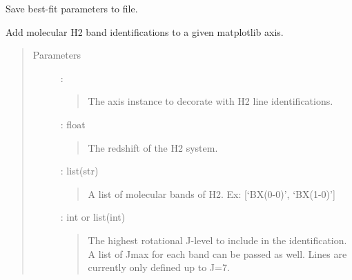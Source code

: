 \documentclass[letterpaper,10pt,english]{sphinxmanual}
\begin{document}

\begin{fulllineitems}
\label{\detokenize{api:output.save_parameters_to_file}}
Save best-fit parameters to file.

\end{fulllineitems}


\begin{fulllineitems}
\label{\detokenize{api:output.show_H2_bands}}
Add molecular H2 band identifications to a given matplotlib axis.
\begin{quote}\begin{description}
\item[{Parameters}] \leavevmode
{} : 
\begin{quote}

The axis instance to decorate with H2 line identifications.
\end{quote}

 : float
\begin{quote}

The redshift of the H2 system.
\end{quote}

 : list(str)
\begin{quote}

A list of molecular bands of H2.
Ex: {[}‘BX(0-0)’, ‘BX(1-0)’{]}
\end{quote}

 : int or list(int)
\begin{quote}

The highest rotational J-level to include in the identification.
A list of Jmax for each band can be passed as well.
Lines are currently only defined up to J=7.
\end{quote}

\end{description}\end{quote}

\end{fulllineitems}
\end{document}
